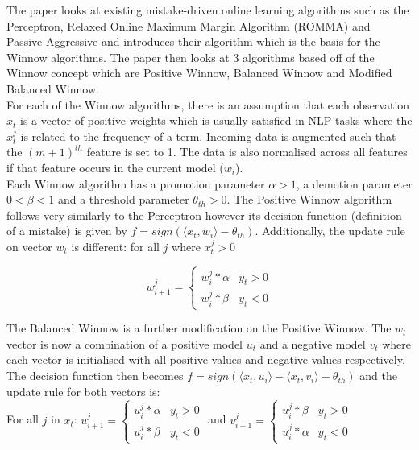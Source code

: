 \documentclass{article}
\begin{document}
The paper looks at existing mistake-driven online learning algorithms such as the Perceptron, Relaxed Online Maximum Margin Algorithm 
(ROMMA) and Passive-Aggressive and introduces their algorithm which is the basis for the Winnow algorithms. The paper then looks at 3 
algorithms based off of the Winnow concept which are Positive Winnow, Balanced Winnow and Modified Balanced Winnow.\\

For each of the Winnow algorithms, there is an assumption that each observation \(x_{t}\) is a vector of positive weights which is usually satisfied
in NLP tasks where the \(x_{t}^{j}\) is related to the frequency of a term. Incoming data is augmented such that the \((m+1)^{th}\) feature is set to 
1. The data is also normalised across all features if that feature occurs in the current model (\(w_{i}\)).\\

Each Winnow algorithm has a promotion parameter \(\alpha > 1\), a demotion parameter \(0 < \beta < 1\) and a threshold parameter \(\theta_{th} > 0\).
The Positive Winnow algorithm follows very similarly to the Perceptron however its decision function (definition of a mistake) is given by
\(f = sign(\langle x_{t}, w_{i} \rangle - \theta_{th})\). Additionally, the update rule on vector \(w_{t}\) is different: 
for all \(j\) where \(x_{t}^{j} > 0\)

\[ w_{i+1}^{j} =
    \begin{cases} 
        w_{i}^{j} * \alpha & y_{t} > 0 \\
        w_{i}^{j} * \beta & y_{t} < 0
     \end{cases}
\]

The Balanced Winnow is a further modification on the Positive Winnow. The \(w_{t}\) vector is now a combination of a positive model \(u_{t}\) and
a negative model \(v_{t}\) where each vector is initialised with all positive values and negative values respectively. The decision function then becomes 
\(f = sign(\langle x_{t}, u_{i} \rangle - \langle x_{t}, v_{i} \rangle - \theta_{th})\) and the update rule for both vectors is:\\

For all \(j\) in \(x_{t}\): \( 
    u_{i+1}^{j} =
    \begin{cases} 
        u_{i}^{j} * \alpha & y_{t} > 0 \\
        u_{i}^{j} * \beta & y_{t} < 0
    \end{cases}
\)    and     \(
    v_{i+1}^{j} = \begin{cases} 
        u_{i}^{j} * \beta & y_{t} > 0 \\
        u_{i}^{j} * \alpha & y_{t} < 0
     \end{cases}
\)\\
\end{document}
